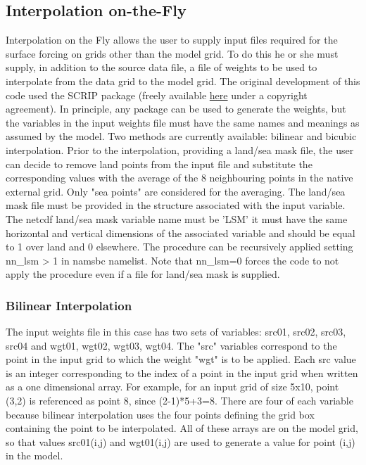 \subsection [Interpolation on-the-Fly] {Interpolation on-the-Fly}
\label{SBC_iof}

Interpolation on the Fly allows the user to supply input files required
for the surface forcing on grids other than the model grid.
To do this he or she must supply, in addition to the source data file,
a file of weights to be used to interpolate from the data grid to the model grid.
The original development of this code used the SCRIP package (freely available 
\href{http://climate.lanl.gov/Software/SCRIP}{here} under a copyright agreement).
In principle, any package can be used to generate the weights, but the
variables in the input weights file must have the same names and meanings as
assumed by the model.
Two methods are currently available: bilinear and bicubic interpolation.
Prior to the interpolation, providing a land/sea mask file, the user can decide to
 remove land points from the input file and substitute the corresponding values 
with the average of the 8 neighbouring points in the native external grid.
 Only "sea points" are considered for the averaging. The land/sea mask file must 
be provided in the structure associated with the input variable.
 The netcdf land/sea mask variable name must be 'LSM' it must have the same 
horizontal and vertical dimensions of the associated variable and should 
be equal to 1 over land and 0 elsewhere.
The procedure can be recursively applied setting nn\_lsm > 1 in namsbc namelist. 
Note that nn\_lsm=0 forces the code to not apply the procedure even if a file for land/sea mask is supplied.

\subsubsection{Bilinear Interpolation}
\label{SBC_iof_bilinear}

The input weights file in this case has two sets of variables: src01, src02,
src03, src04 and wgt01, wgt02, wgt03, wgt04.
The "src" variables correspond to the point in the input grid to which the weight
"wgt" is to be applied. Each src value is an integer corresponding to the index of a 
point in the input grid when written as a one dimensional array.  For example, for an input grid
of size 5x10, point (3,2) is referenced as point 8, since (2-1)*5+3=8.
There are four of each variable because bilinear interpolation uses the four points defining
the grid box containing the point to be interpolated.
All of these arrays are on the model grid, so that values src01(i,j) and
wgt01(i,j) are used to generate a value for point (i,j) in the model.

